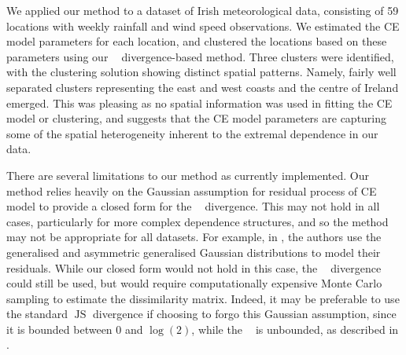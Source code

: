 \documentclass[
  12pt]{article}
\DeclareMathOperator{\JS}{\mathrm{JS}}
\newcommand{\JSGa}{\mathop{\mathrm{JS}^{\mathrm{G}_{\lambda}}}\nolimits}
\begin{document}
We applied our method to a dataset of Irish meteorological data, consisting of 59 locations with weekly rainfall and wind speed observations.
We estimated the CE model parameters for each location, and clustered the locations based on these parameters using our $\JSGa{}$ divergence-based method. 
Three clusters were identified, with the clustering solution showing distinct spatial patterns.
Namely, fairly well separated clusters representing the east and west coasts and the centre of Ireland emerged.
This was pleasing as no spatial information was used in fitting the CE model or clustering, and suggests that the CE model parameters are capturing some of the spatial heterogeneity inherent to the extremal dependence in our data. 

There are several limitations to our method as currently implemented.
Our method relies heavily on the Gaussian assumption for residual process of CE model to provide a closed form for the $\JSGa{}$ divergence.
This may not hold in all cases, particularly for more complex dependence structures, and so the method may not be appropriate for all datasets.
For example, in \citet{Farrell2025}, the authors use the generalised and asymmetric generalised Gaussian distributions to model their residuals. 
While our closed form would not hold in this case, the $\JSGa{}$ divergence could still be used, but would require computationally expensive Monte Carlo sampling to estimate the dissimilarity matrix.
Indeed, it may be preferable to use the standard $\JS{}$ divergence if choosing to forgo this Gaussian assumption, since it is bounded between 0 and $\log{(2)}$, while the $\JSGa{}$ is unbounded, as described in \citet{Thiagarajan2025}.

\end{document}
